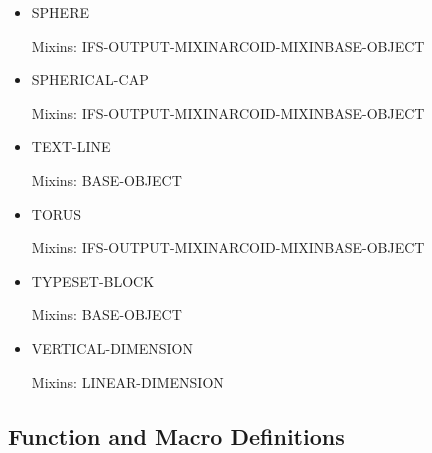 \documentclass [11pt]{book}
\begin{document}
\begin{itemize}
\item {}SPHERE

Mixins: IFS-OUTPUT-MIXINARCOID-MIXINBASE-OBJECT



\item {}SPHERICAL-CAP

Mixins: IFS-OUTPUT-MIXINARCOID-MIXINBASE-OBJECT



\item {}TEXT-LINE

Mixins: BASE-OBJECT



\item {}TORUS

Mixins: IFS-OUTPUT-MIXINARCOID-MIXINBASE-OBJECT



\item {}TYPESET-BLOCK

Mixins: BASE-OBJECT



\item {}VERTICAL-DIMENSION

Mixins: LINEAR-DIMENSION



\end{itemize}



\subsection{Function and Macro Definitions}

\label{subsec:functionandmacrodefinitions}
\end{document}
